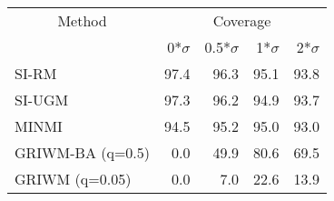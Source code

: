 
\begin{tabular}{lrrrr}
\toprule
\multicolumn{1}{c}{Method} & \multicolumn{4}{c}{Coverage} \\
 & 0*$\sigma$ & 0.5*$\sigma$ & 1*$\sigma$ & 2*$\sigma$\\
\midrule
SI-RM & 97.4 & 96.3 & 95.1 & 93.8\\
SI-UGM & 97.3 & 96.2 & 94.9 & 93.7\\
MINMI & 94.5 & 95.2 & 95.0 & 93.0\\
GRIWM-BA (q=0.5) & 0.0 & 49.9 & 80.6 & 69.5\\
GRIWM (q=0.05) & 0.0 & 7.0 & 22.6 & 13.9\\
\bottomrule
\end{tabular}
